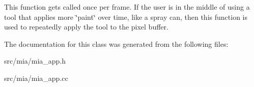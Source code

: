 This function gets called once per frame. If the user is in the middle of using a tool that applies more \char`\"{}paint\char`\"{} over time, like a spray can, then this function is used to repeatedly apply the tool to the pixel buffer. 

The documentation for this class was generated from the following files\+:\begin{DoxyCompactItemize}
\item 
src/mia/mia\+\_\+app.\+h\item 
src/mia/mia\+\_\+app.\+cc\end{DoxyCompactItemize}
